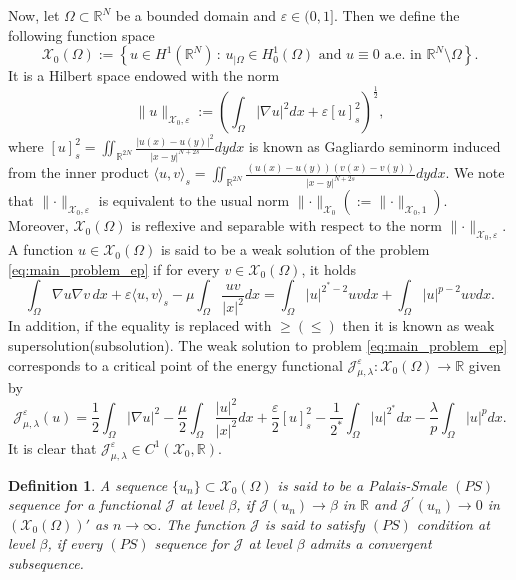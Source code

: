\documentclass[11pt]{article}
\newtheorem{definition}{Definition}[section] %
\newcommand{\R}{\mathbb{R}}
\newcommand{\om} {\Omega}
\newcommand{\real}{\mathbb{R}}
\newcommand{\rnn}{\mathbb{R}^{N}}
\newcommand{\rtwon}{\mathbb{R}^{2N}}
\newcommand{\lv}{\lVert}
\newcommand{\rv}{\rVert}
\newcommand{\grad}{\nabla}
\newcommand{\X}{\mathcal{X}_0} %
\newcommand{\Je}{\mathcal{J}_{\mu,\lambda}^{\varepsilon}} %
\begin{document}
Now, let $\om \subset \rnn$ be a bounded domain and $\varepsilon \in (0,1]$. Then we define the following function space
\begin{equation*}
\X(\Omega) := \left\{ u \in H^1(\mathbb{R}^N) \,:\, u_{|\Omega} \in H_0^1(\Omega) \text{ and } u \equiv 0 \text{ a.e. in } \mathbb{R}^N \setminus \Omega \right\}.
\end{equation*}
It is a Hilbert space endowed with the norm 
\begin{equation*}
    \lv u \rv_{\X,\varepsilon} := \left( \int_{\om} |\grad u|^2 dx +  \varepsilon [ u ]_s^2\right)^{\frac{1}{2}},
\end{equation*}
where $[u]_s^2 = \iint_{\rtwon} \frac{|u(x) - u(y)|^2}{|x-y|^{N +2s}}dy dx$ is known as Gagliardo seminorm induced from the inner product $\langle u, v\rangle_s = \iint_{\rtwon} \frac{(u(x) - u(y))(v(x) - v(y))}{|x - y|^{N  + 2s}}dy dx$. We note that $\lv \cdot \rv_{\X,\varepsilon}$ is equivalent to the usual norm $\lv \cdot \rv_{\X} \left( := \lv \cdot \rv_{\X,1} \right)$. Moreover, $\X(\om)$ is reflexive and separable with respect to the norm $\lv \cdot \rv_{\X,\varepsilon}$. \\
A function $u \in \X(\om)$ is said to be a weak solution of the problem \eqref{eq:main_problem_ep} if for every $v \in \X(\om)$, it holds 
\begin{equation*}
    \int_{\om} \grad u \grad v \, dx + \varepsilon \langle u , v\rangle_s - \mu \int_{\om} \frac{u v}{|x|^2}dx = \int_{\om} |u|^{2^* -2}u v dx + \int_{\om} |u|^{p-2}u v dx.
\end{equation*}
In addition, if the equality is replaced with $\geq(\leq)$ then it is known as weak supersolution(subsolution). 
The weak solution to problem \eqref{eq:main_problem_ep} corresponds to a critical point of the energy functional $\Je: \X(\Omega) \to \mathbb{R}$ given by
\begin{equation*}
\Je(u) = \frac{1}{2} \int_{\Omega} |\nabla u|^2 - \frac{\mu}{2} \int_{\Omega} \frac{|u|^2}{|x|^2} dx
+ \frac{\varepsilon}{2} [u]_{s}^2 
- \frac{1}{2^*} \int_{\Omega} |u|^{2^*} dx
- \frac{\lambda}{p} \int_{\Omega} |u|^{p}dx.
\end{equation*}
It is clear that $\Je \in C^1(\X,\real)$. 

\begin{definition}
    A sequence $\{ u_n \} \subset \X(\Omega)$ is said to be a Palais-Smale $(PS)$ sequence for a functional $\mathcal{J}$ at level $\beta$, if $\mathcal{J}(u_n) \to \beta$ in $\R$ and $\mathcal{J}^{\prime}(u_n) \to 0$ in $(\X(\Omega))'$ as $n \to \infty$. The function $\mathcal{J}$ is said to satisfy $(PS)$ condition at level $\beta$, if every $(PS)$ sequence for $\mathcal{J}$ at level $\beta$ admits a convergent subsequence.
\end{definition}
\end{document}
